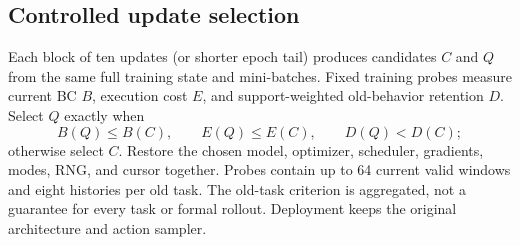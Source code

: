 \subsection{Controlled update selection}
Each block of ten updates (or shorter epoch tail) produces candidates $C$
and $Q$ from the same full training state and mini-batches. Fixed training
probes measure current BC $B$, execution cost $E$, and support-weighted
old-behavior retention $D$. Select $Q$ exactly when
\begin{equation}
B(Q)\le B(C),\qquad E(Q)\le E(C),\qquad D(Q)<D(C);
\end{equation}
otherwise select $C$. Restore the chosen model, optimizer, scheduler,
gradients, modes, RNG, and cursor together. Probes contain up to 64 current
valid windows and eight histories per old task. The old-task criterion
is aggregated, not a guarantee for every task or formal rollout.
Deployment keeps the original architecture and action sampler.
